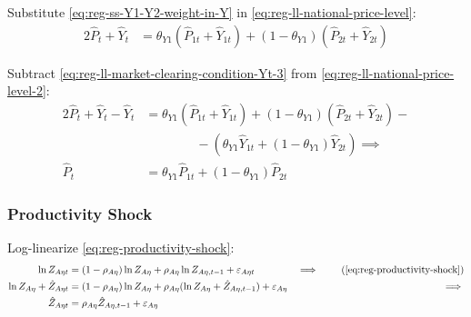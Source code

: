 \documentclass[../thesis.tex]{subfiles}
\begin{document}
	\begin{comment}
		Define the regional weights $\langle \begin{smallmatrix} \theta_{PY1} & (1-\theta_{PY1}) \end{smallmatrix} \rangle$ in the gross domestic production:
		\begin{align}
			\left\langle \begin{matrix} \theta_{PY1} & (1-\theta_{PY1}) \end{matrix} \right\rangle \coloneq \left\langle \begin{matrix} \frac{P_{1} Y_{1}}{P Y} & \frac{P_{2} Y_{2}}{PY} \end{matrix} \right\rangle \label{eq:reg-ss-PYn-weight-in-PY}
		\end{align}
		
		Substitute \ref{eq:reg-ss-PYn-weight-in-PY} in \ref{eq:reg-ll-national-price-level}:
		
	\end{comment}


Substitute \ref{eq:reg-ss-Y1-Y2-weight-in-Y} in \ref{eq:reg-ll-national-price-level}:
\begin{alignat}{2}
	\hat{P}_{t} + \hat{Y}_{t} &= \theta_{Y1} (\hat{P}_{1t} + \hat{Y}_{1t}) + (1-\theta_{Y1}) (\hat{P}_{2t} + \hat{Y}_{2t})  \label{eq:reg-ll-national-price-level-2}
\end{alignat}

Subtract \ref{eq:reg-ll-market-clearing-condition-Yt-3} from \ref{eq:reg-ll-national-price-level-2}:
\begin{alignat}{2}
	\hat{P}_{t} + \hat{Y}_{t} - \hat{Y}_{t} &= \theta_{Y1} (\hat{P}_{1t} + \hat{Y}_{1t}) + (1-\theta_{Y1}) (\hat{P}_{2t} + \hat{Y}_{2t}) - \nonumber \\ & \qquad \qquad - (\theta_{Y1} \hat{Y}_{1t} + (1-\theta_{Y1}) \hat{Y}_{2t}) \implies \nonumber \\
	\hat{P}_{t} &= \theta_{Y1} \hat{P}_{1t} + (1-\theta_{Y1}) \hat{P}_{2t} \label{eq:reg-ll-national-price-level-3}
\end{alignat}


\subsubsection*{Productivity Shock}

Log-linearize \ref{eq:reg-productivity-shock}:
\begin{alignat}{2}
	\ln{Z_{A\eta t}} &= (1-\rho_{A\eta})\ln{Z_{A\eta}} + \rho_{A\eta}\ln{Z_{A\eta,t-1}} + \varepsilon_{A\eta t} &\implies \tag{\ref{eq:reg-productivity-shock}} \\
	\ln{Z_{A\eta}} + \hat{Z}_{A\eta t} &= (1-\rho_{A\eta}) \ln{Z_{A\eta}} + \rho_{A\eta} (\ln{Z_{A\eta}} + \hat{Z}_{A\eta, t-1}) + \varepsilon_{A\eta} &\implies \nonumber \\
	\hat{Z}_{A\eta t} &= \rho_{A\eta} \hat{Z}_{A\eta, t-1} + \varepsilon_{A\eta} \label{eq:reg-ll-productivity-shock}
\end{alignat}
\end{document}
